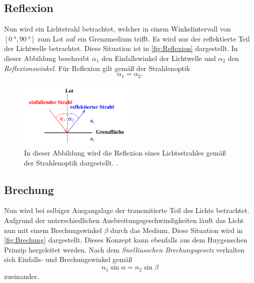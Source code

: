 \subsection{Reflexion}
\label{subsec:Reflexion}
Nun wird ein Lichtstrahl betrachtet, welcher in einem Winkelintervall von $[\qty{0}{\degree},\qty{90}{\degree}]$ zum Lot auf ein Grenzmedium trifft. Es wird nur der reflektierte Teil
der Lichtwelle betrachtet. Diese Situation ist in \autoref{fig:Reflexion} dargestellt. In dieser Abbildung
beschreibt $\alpha_1$ den Einfallswinkel der Lichtwelle und $\alpha_2$ den \textit{Reflexionswinkel}. Für Reflexion gilt gemäß der Strahlenoptik 
\begin{equation}
  \label{eqn:Reflexionsgesetz}
  \alpha_1 = \alpha_2.
\end{equation}

\begin{figure}
  \centering
  \includegraphics[width=0.5\textwidth]{content/Reflexion.png}
  \caption{In dieser Abbildung wird die Reflexion eines Lichtsstrahles gemäß der Strahlenoptik dargestellt. \cite{v400}.}
  \label{fig:Reflexion}
\end{figure}

\subsection{Brechung}
\label{subsec:Brechung}
Nun wird bei selbiger Ausgangslage der transmitierte Teil des Lichts betrachtet.  
Aufgrund der unterschiedlichen Ausbreitungsgeschwindigkeiten läuft das Licht nun mit einem Brechungswinkel $\beta$ durch das Medium. Diese Situation wird in 
\autoref{fig:Brechung} dargestellt. Dieses Konzept kann ebenfalls aus dem 
Huygenschen Prinzip hergeleitet werden. Nach dem \textit{Snelliusschen Brechungsgesetz} verhalten sich Einfalls- und Brechungswinkel gemäß
\begin{equation}
  \label{eqn:Brechung}
  n_1\sin\alpha = n_2\sin\beta
\end{equation}
zueinander.

